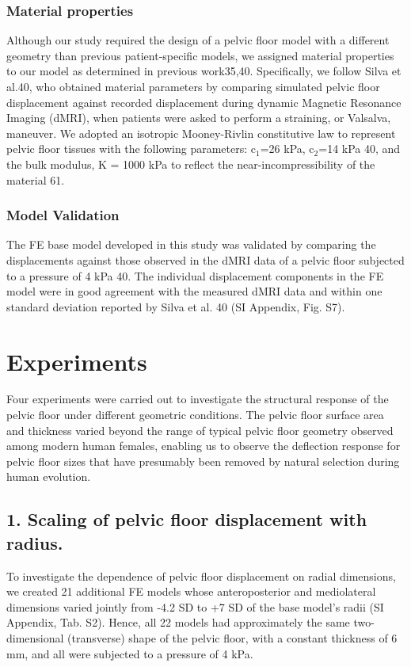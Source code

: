 \documentclass[9pt,twocolumn,twoside]{pnas-new}
\begin{document}
\subsubsection*{Material properties}
Although our study required the design of a pelvic floor model with a different geometry than previous patient-specific models, we assigned material properties to our model as determined in previous work35,40. Specifically, we follow Silva et al.40, who obtained material parameters by comparing simulated pelvic floor displacement against recorded displacement during dynamic Magnetic Resonance Imaging (dMRI), when patients were asked to perform a straining, or Valsalva, maneuver. We adopted an isotropic Mooney-Rivlin constitutive law to represent pelvic floor tissues with the following parameters: c$_1$=26 kPa, c$_2$=14 kPa 40, and the bulk modulus, K = 1000 kPa to reflect the near-incompressibility of the material 61.
\subsubsection*{Model Validation}
The FE base model developed in this study was validated by comparing the displacements against those observed in the dMRI data of a pelvic floor subjected to a pressure of 4 kPa 40. The individual displacement components in the FE model were in good agreement with the measured dMRI data and within one standard deviation reported by Silva et al. 40 (SI Appendix, Fig. S7). 
\section*{Experiments}
Four experiments were carried out to investigate the structural response of the pelvic floor under different geometric conditions. The pelvic floor surface area and thickness varied beyond the range of typical pelvic floor geometry observed among modern human females, enabling us to observe the deflection response for pelvic floor sizes that have presumably been removed by natural selection during human evolution. 
\subsection*{1. Scaling of pelvic floor displacement with radius.} To investigate the dependence of pelvic floor displacement on radial dimensions, we created 21 additional FE models whose anteroposterior and mediolateral dimensions varied jointly from -4.2 SD to +7 SD of the base model’s radii (SI Appendix, Tab. S2). Hence, all 22 models had approximately the same two-dimensional (transverse) shape of the pelvic floor, with a constant thickness of 6 mm, and all were subjected to a pressure of 4 kPa.
\end{document}
